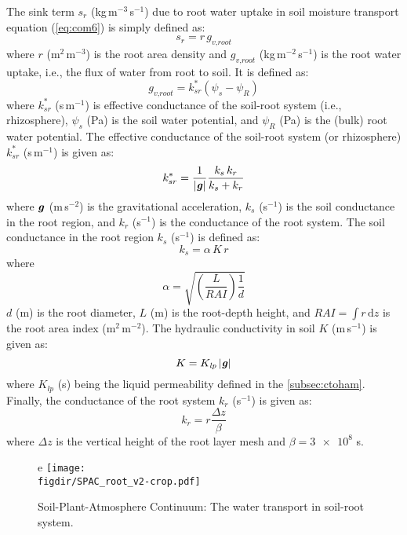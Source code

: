 The sink term $s_r$ (kg\,m$^{-3}$\,s$^{-1}$) due to root water uptake in soil moisture transport equation (\cref{eq:com6}) is simply defined as:
\begin{equation}
s_r = r \, g_{\textit{v,root}}
\end{equation}
where $r$ (m$^2$\,m$^{-3}$) is the root area density and $g_{\textit{v,root}}$ (kg\,m$^{-2}$\,s$^{-1}$) is the root water uptake, i.e., the flux of water from root to soil. It is defined as:
\begin{equation}
g_{\textit{v,root}} = k_{sr}^*\left(\psi_s - \psi_R\right)
\end{equation}
where $k_{sr}^*$ (s\,m$^{-1}$) is effective conductance of the soil-root system (i.e., rhizosphere), $\psi_s$ (Pa) is the soil water potential, and $\psi_R$ (Pa) is the (bulk) root water potential. The effective conductance of the soil-root system (or rhizosphere) $k_{sr}^*$ (s\,m$^{-1}$) is given as:
\begin{equation}
k_{sr}^* = \frac{1}{|\textbf{\textit{g}}|} \frac{k_s\,k_r}{k_s + k_r}
\end{equation}
where $\textbf{\textit{g}}$ (m\,s$^{-2}$) is the gravitational acceleration, $k_s$ (s$^{-1}$) is the soil conductance in the root region, and $k_r$ (s$^{-1}$) is the conductance of the root system. The soil conductance in the root region $k_s$ (s$^{-1}$) is defined as:
\begin{equation}
k_s = \alpha \, K \, r
\end{equation}
where
\begin{equation}
\alpha =  \sqrt{\left(\frac{L}{\textit{RAI}}\right) \frac{1}{d}}
\end{equation}
$d$ (m) is the root diameter, $L$ (m) is the root-depth height, and $\textit{RAI} = \int r\,\mathrm{d}z$ is the root area index (m$^2$\,m$^{-2}$). The hydraulic conductivity in soil $K$ (m\,s$^{-1}$) is given as:
\begin{equation}
K = K_{\textit{lp}} \, |\textbf{\textit{g}}|
\end{equation}
where $K_{\textit{lp}}$ (s) being the liquid permeability defined in the \cref{subsec:ctoham}. Finally, the conductance of the root system $k_r$ (s$^{-1}$) is given as:
\begin{equation}
k_r = r \frac{\Delta z}{\beta}
\end{equation}
where $\Delta z$ is the vertical height of the root layer mesh and $\beta = \num{3e8}$ s. 

\begin{figure}[t]
	\centering
e
	\texttt{[image: \\figdir/SPAC\_root\_v2-crop.pdf]}
	\caption{Soil-Plant-Atmosphere Continuum: The water transport in soil-root system.}
	\label{fig:SPAC_root}
\end{figure}

